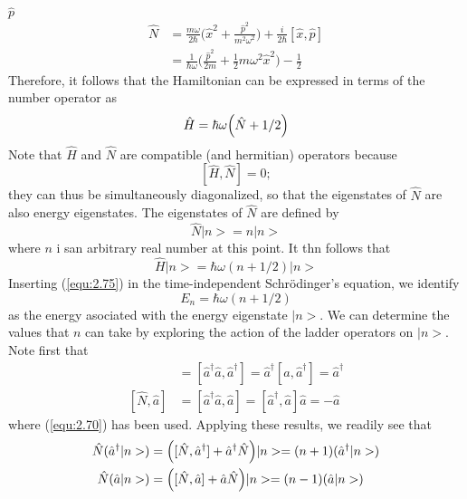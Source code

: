 $\hat{p}$
\begin{align}
  \hat{N} &= \frac{m\omega}{2\hbar} \biggl(\hat{x}^2 +
  \frac{\hat{p}^2}{m^2 \omega^2}\biggr) +
  \frac{i}{2\hbar}[\hat{x},  \hat{p}] \nonumber \\
  &=
  \frac{1}{\hbar\omega}\biggl(\frac{\hat{p}^2}{2m}+\frac{1}{2}m\omega^2
  \hat{x}^2\biggr) - \frac{1}{2} \label{equ:2.72}
\end{align}
Therefore, it follows that the Hamiltonian can be expressed
in terms of the number operator as
\begin{equation}
  \hat{H} = \hbar\omega \Bigl(\hat{N}+1/2\Bigr)
  \label{equ:2.73}
\end{equation}
Note that $\hat{H}$ and $\hat{N}$ are compatible (and
hermitian) operators because
$$
[\hat{H},  \hat{N}] = 0;
$$
they can thus be simultaneously diagonalized, so that the
eigenstates of $\hat{N}$ are also energy eigenstates.
The eigenstates of $\hat{N}$ are defined by
\begin{equation}
  \hat{N} |n>= n |n>
  \label{equ:2.74}
\end{equation}
where $n$ i san arbitrary real number at this point. It thn
follows that
\begin{equation}
  \hat{H} |n> = \hbar\omega (n+1/2)|n>
  \label{equ:2.75}
\end{equation}
Inserting (\ref{equ:2.75}) in the time-independent
Schrödinger's equation, we identify
$$
E_n = \hbar\omega (n+1/2)
$$
as the energy asociated with the energy eigenstate $|n>$.
We can determine the values that $n$ can take by exploring
the action of the ladder operators on $|n>$. Note first that
\begin{align}
  [\hat{N}, \hat{a}^{\dagger}] &=
  [\hat{a}^{\dagger}\hat{a},\hat{a}^{\dagger}] =
  \hat{a}^{\dagger}[\hat{a}, \hat{a}^{\dagger}] =
  \hat{a}^{\dagger} \nonumber\\
  [\hat{N}, \hat{a}] &= [\hat{a}^{\dagger}\hat{a}, \hat{a}]
  = [\hat{a}^{\dagger}, \hat{a}] \hat{a}=  - \hat{a}
  \label{equ:2.76}
\end{align}
where (\ref{equ:2.70}) has been used. Applying these
results, we readily see that
\begin{subequations}
  \begin{align}
    \hat{N} (\hat{a}^{\dagger} |n>) &=
    \Bigl([\hat{N},\hat{a}^{\dagger}]+\hat{a}^{\dagger}\hat{N}\Bigr)|n>
    = (n+1)(\hat{a}^{\dagger} |n>) \label{equ:2.77a} \\
    \hat{N}(\hat{a}|n>) &= \Bigl([\hat{N},
  \hat{a}]+\hat{a}\hat{N}\Bigr) |n> = (n-1) (\hat{a}|n>)
  \label{equ:2.77b}
  \end{align}
\end{subequations}
